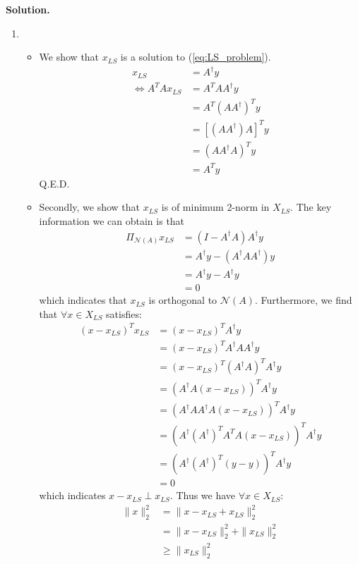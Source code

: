 \documentclass[english,onecolumn]{IEEEtran}
\begin{document}
\noindent
\textbf{Solution.}
\begin{enumerate}
	\item \begin{itemize}
		\item We show that $x_{LS}$ is a solution to (\ref{eq:LS_problem}).
		\begin{align*}
			x_{LS} &= A^{\dagger}y\\
			\Leftrightarrow A^TAx_{LS} &= A^TAA^{\dagger}y\\
			&=A^T(AA^{\dagger})^Ty\\
			&=[(AA^{\dagger})A]^Ty\\
			&=(AA^{\dagger}A)^Ty\\
			&=A^Ty
		\end{align*}
		Q.E.D.
		\item Secondly, we show that $x_{LS}$ is of minimum 2-norm in $X_{LS}$. The key information we can obtain is that 
		\begin{align*}
			\Pi_{\mathcal{N}(A)}x_{LS} &= (I-A^{\dagger}A)A^{\dagger}y\\
			&=A^{\dagger}y - (A^{\dagger}AA^{\dagger})y\\
			&=A^{\dagger}y - A^{\dagger}y\\
			&=0
		\end{align*}
		which indicates that $x_{LS}$ is orthogonal to $\mathcal{N}(A)$. Furthermore, we find that $\forall x \in X_{LS}$ satisfies:
		\begin{align*}
			(x-x_{LS})^Tx_{LS} &= (x-x_{LS})^TA^{\dagger}y\\
			&= (x-x_{LS})^TA^{\dagger}AA^{\dagger}y\\
			&=(x-x_{LS})^T(A^{\dagger}A)^TA^{\dagger}y\\
			&=\left(A^{\dagger}A(x-x_{LS})\right)^TA^{\dagger}y\\
			&=\left(A^{\dagger}AA^{\dagger}A(x-x_{LS})\right)^TA^{\dagger}y\\
			&=\left(A^{\dagger}(A^{\dagger})^TA^TA(x-x_{LS})\right)^TA^{\dagger}y\\
			&=\left(A^{\dagger}(A^{\dagger})^T(y-y)\right)^TA^{\dagger}y\\
			&=0
		\end{align*}
		which indicates $x-x_{LS}\perp x_{LS}$. Thus we have $\forall x \in X_{LS}$:
		\begin{align*}
			\|x\|_2^2 &= \|x-x_{LS}+x_{LS}\|_2^2\\
			&= \|x-x_{LS}\|_2^2 + \|x_{LS}\|_2^2\\
			&\ge \|x_{LS}\|_2^2
		\end{align*}

\end{itemize}
\end{enumerate}
\end{document}
